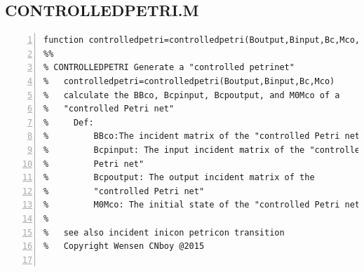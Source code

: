 \documentclass[11pt]{article}
\begin{document}
\begin{flushleft}
\section{CONTROLLEDPETRI.M}
\begin{lstlisting}[numbers=left]
function controlledpetri=controlledpetri(Boutput,Binput,Bc,Mco,M0)
%%
% CONTROLLEDPETRI Generate a "controlled petrinet"
%   controlledpetri=controlledpetri(Boutput,Binput,Bc,Mco)
%   calculate the BBco, Bcpinput, Bcpoutput, and M0Mco of a
%   "controlled Petri net"
%     Def:
%         BBco:The incident matrix of the "controlled Petri net"
%         Bcpinput: The input incident matrix of the "controlled
%         Petri net" 
%         Bcpoutput: The output incident matrix of the
%         "controlled Petri net"
%         M0Mco: The initial state of the "controlled Petri net"
% 
%   see also incident inicon petricon transition 
%   Copyright Wensen CNboy @2015


\end{lstlisting}
\end{flushleft}
\end{document}
